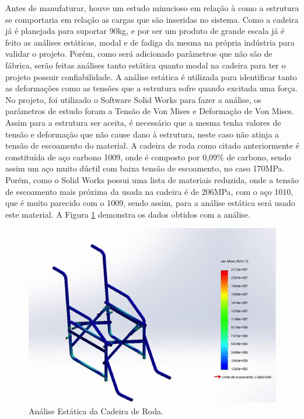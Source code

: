 Antes de manufaturar, houve um estudo minucioso em relação à como a estrutura
se comportaria em relação as cargas que são inseridas no sistema. Como a
cadeira já é planejada para suportar 90kg, e por ser um produto de grande
escala já é feito as análises estáticas, modal e de fadiga da mesma na própria
indústria para validar o projeto. Porém, como será adicionado parâmetros que
não são de fábrica, serão feitas análises tanto estática quanto modal na
cadeira para ter o projeto possuir confiabilidade. A análise estática é
utilizada para identificar tanto as deformações como as tensões que a estrutura
sofre quando excitada uma força. No projeto, foi utilizado o Software Solid
Works para fazer a análise, os parâmetros de estudo foram a Tensão de Von Mises
e Deformação de Von Mises. Assim para a estrutura ser aceita, é necessário que
a mesma tenha valores de tensão e deformação que não cause dano à estrutura,
neste caso não atinja a tensão de escoamento do material. A cadeira de roda
como citado anteriormente é constituída de aço carbono 1009, onde é composto
por 0,09\% de carbono, sendo assim um aço muito dúctil com baixa tensão de
escoamento, no caso 170MPa. Porém, como o Solid Works possui uma lista de
materiais reduzida, onde a tensão de escoamento mais próxima da usada na
cadeira é de 206MPa, com o aço 1010, que é muito parecido com o 1009, sendo
assim, para a análise estática será usado este material.
A Figura \ref{fig:static_analisys} demonstra os dados obtidos com a análise.

\begin{figure}[!htb]
    \begin{center}
        \includegraphics{figuras/static_analisys.png}
    \end{center}
    \caption{Análise Estática da Cadeira de Roda.}
    \label{fig:static_analisys}
\end{figure}

